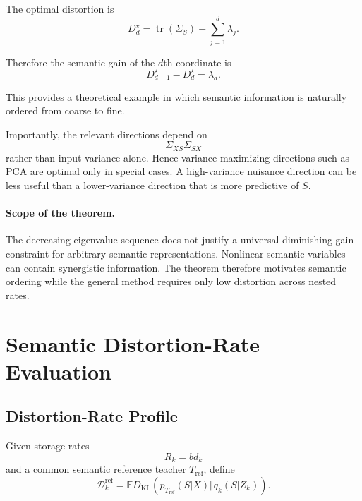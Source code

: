 \documentclass[11pt]{article}
\newcommand{\KL}{D_{\mathrm{KL}}}
\newcommand{\E}{\mathbb{E}}
\newcommand{\cD}{\mathcal{D}}
\begin{document}
The optimal distortion is
\begin{equation}
\boxed{
    D_d^\star
    =
    \operatorname{tr}(\Sigma_S)
    -
    \sum_{j=1}^d\lambda_j.
}
\end{equation}

Therefore the semantic gain of the $d$th coordinate is
\begin{equation}
\boxed{
    D_{d-1}^\star-D_d^\star
    =
    \lambda_d.
}
\end{equation}

This provides a theoretical example in which semantic information is naturally ordered from coarse to fine.

Importantly, the relevant directions depend on
\begin{equation}
    \Sigma_{XS}\Sigma_{SX}
\end{equation}
rather than input variance alone.
Hence variance-maximizing directions such as PCA are optimal only in special cases.
A high-variance nuisance direction can be less useful than a lower-variance direction that is more predictive of $S$.

\paragraph{Scope of the theorem.}
The decreasing eigenvalue sequence does not justify a universal diminishing-gain constraint for arbitrary semantic representations.
Nonlinear semantic variables can contain synergistic information.
The theorem therefore motivates semantic ordering while the general method requires only low distortion across nested rates.


\section{Semantic Distortion-Rate Evaluation}

\subsection{Distortion-Rate Profile}
\label{sec:profile}

Given storage rates
\begin{equation}
    R_k=bd_k
\end{equation}
and a common semantic reference teacher $T_{\mathrm{ref}}$, define
\begin{equation}
    \cD_k^{\mathrm{ref}}
    =
    \E
    \KL
    \left(
        p_{T_{\mathrm{ref}}}(S|X)
        \Vert
        q_k(S|Z_k)
    \right).
\end{equation}
\end{document}
